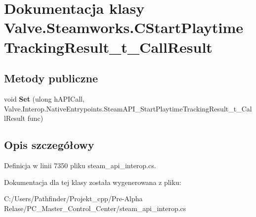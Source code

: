 \hypertarget{class_valve_1_1_steamworks_1_1_c_start_playtime_tracking_result__t___call_result}{}\section{Dokumentacja klasy Valve.\+Steamworks.\+C\+Start\+Playtime\+Tracking\+Result\+\_\+t\+\_\+\+Call\+Result}
\label{class_valve_1_1_steamworks_1_1_c_start_playtime_tracking_result__t___call_result}
\subsection*{Metody publiczne}
\begin{DoxyCompactItemize}
\item 
\mbox{\label{class_valve_1_1_steamworks_1_1_c_start_playtime_tracking_result__t___call_result_ac43bcd24ded74272626523f2d55d9b33}} 
void {\bfseries Set} (ulong h\+A\+P\+I\+Call, Valve.\+Interop.\+Native\+Entrypoints.\+Steam\+A\+P\+I\+\_\+\+Start\+Playtime\+Tracking\+Result\+\_\+t\+\_\+\+Call\+Result func)
\end{DoxyCompactItemize}


\subsection{Opis szczegółowy}


Definicja w linii 7350 pliku steam\+\_\+api\+\_\+interop.\+cs.



Dokumentacja dla tej klasy została wygenerowana z pliku\+:\begin{DoxyCompactItemize}
\item 
C\+:/\+Users/\+Pathfinder/\+Projekt\+\_\+cpp/\+Pre-\/\+Alpha Relase/\+P\+C\+\_\+\+Master\+\_\+\+Control\+\_\+\+Center/steam\+\_\+api\+\_\+interop.\+cs\end{DoxyCompactItemize}
